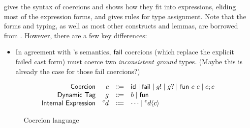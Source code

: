 \documentclass[index.tex]{subfiles}
\begin{document}
 gives the syntax of coercions and shows how they fit into expressions,
eliding most of the expression forms, and  gives rules for type
assignment. Note that the forms and typing, as well as most other constructs and lemmas, are
borrowed from \textcite{herman2010}. However, there are a few key differences:
%
\begin{itemize}
  \item In agreement with \HazelnutLive's semantics, $\textsf{fail}$ coercions (which replace the explicit
    failed cast form) must coerce two \emph{inconsistent ground} types. (Maybe this is already the
    case for those fail coercions?)
\end{itemize}

\begin{figure}[htb!]
  \[\begin{array}{rrcl}
    \textsf{Coercion}  & c  & \Coloneqq & \textsf{id} \mid \textsf{fail}
                                 \mid g! \mid g? 
                                 \mid \textsf{fun} ~c ~c \mid c; c \\
    \textsf{Dynamic Tag} & g & \Coloneqq & b \mid \textsf{fun} \\
    \textsf{Internal Expression} & \prescript{c}{}{d} & \Coloneqq & \cdots \mid \prescript{c}{}{d} \langle c \rangle
  \end{array}\]
  \caption{Coercion language}
  \label{fig:coercion-syntax}
\end{figure}
\end{document}
